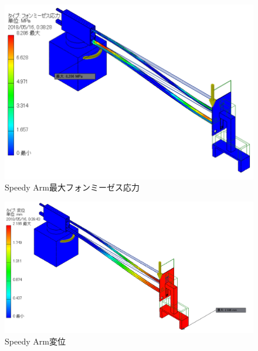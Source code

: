 \documentclass[10pt,b5paper,papersize,dvipdfmx]{jsbook}
\begin{document}
\begin{figure}[H]
  \centering
  \includegraphics[width=.65\textwidth]{img/robot29.png}
  \caption{Speedy Arm最大フォンミーゼス応力}
  \label{fig:Speedy Arm最大フォンミーゼス応力}
\end{figure}
\begin{figure}[H]
  \centering
  \includegraphics[width=.7\textwidth]{img/robot30.png}
  \caption{Speedy Arm変位}
  \label{fig:Speedy Arm変位}
\end{figure}
\end{document}
